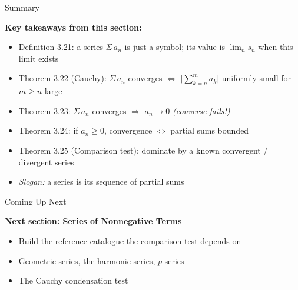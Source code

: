 \documentclass[aspectratio=169,12pt,t]{beamer}
\begin{document}
{%
\begin{frame}{Summary}
  \begin{hlbox}
    \textbf{Key takeaways from this section:}
    \begin{itemize}
      \item \alert{Definition 3.21:} a series $\Sigma\, a_n$ is just a
        symbol; its value is $\lim_{n} s_n$ when this limit exists
      \item \alert{Theorem 3.22 (Cauchy):}
        $\Sigma\, a_n$ converges $\iff$
        $\bigl|\sum_{k=n}^{m} a_k\bigr|$ uniformly small for
        $m \geq n$ large
      \item \alert{Theorem 3.23:} $\Sigma\, a_n$ converges
        $\Longrightarrow$ $a_n \to 0$
        \emph{(converse fails!)}
      \item \alert{Theorem 3.24:} if $a_n \geq 0$, convergence
        $\iff$ partial sums bounded
      \item \alert{Theorem 3.25 (Comparison test):} dominate by a
        known convergent / divergent series
      \item \emph{Slogan:} \alert{a series is its sequence of
        partial sums}
    \end{itemize}
  \end{hlbox}

\end{frame}

\begin{frame}{Coming Up Next}
  \begin{hlbox}
    \textbf{Next section: Series of Nonnegative Terms}
    \begin{itemize}
      \item Build the \alert{reference catalogue} the comparison test
        depends on
      \item Geometric series, the harmonic series, $p$-series
      \item The Cauchy condensation test
    \end{itemize}
  \end{hlbox}


\end{frame}}
\end{document}
